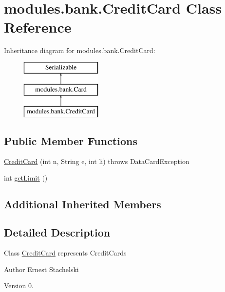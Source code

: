 \hypertarget{classmodules_1_1bank_1_1_credit_card}{}\section{modules.\+bank.\+Credit\+Card Class Reference}
\label{classmodules_1_1bank_1_1_credit_card}
Inheritance diagram for modules.\+bank.\+Credit\+Card\+:\begin{figure}[H]
\begin{center}
\leavevmode
\includegraphics[height=3.000000cm]{classmodules_1_1bank_1_1_credit_card}
\end{center}
\end{figure}
\subsection*{Public Member Functions}
\begin{DoxyCompactItemize}
\item 
\mbox{\hyperlink{classmodules_1_1bank_1_1_credit_card_a8e6b9ecf2a7bfa17d3ac713caa427320}{Credit\+Card}} (int n, String e, int li)  throws Data\+Card\+Exception 
\item 
int \mbox{\hyperlink{classmodules_1_1bank_1_1_credit_card_a370decd7fd4895c200d38045ba60d939}{get\+Limit}} ()
\end{DoxyCompactItemize}
\subsection*{Additional Inherited Members}


\subsection{Detailed Description}
Class \mbox{\hyperlink{classmodules_1_1bank_1_1_credit_card}{Credit\+Card}} represents Credit\+Cards \begin{DoxyAuthor}{Author}
Ernest Stachelski 
\end{DoxyAuthor}
\begin{DoxyVersion}{Version}
0. 
\end{DoxyVersion}


